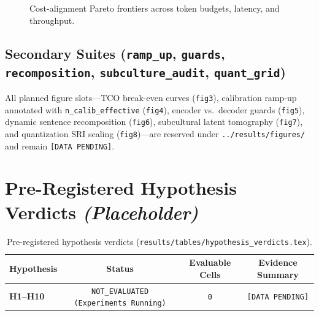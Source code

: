 \documentclass[11pt,letterpaper]{article}
\begin{document}
\begin{figure}[ht]
\centering
\caption{Cost-alignment Pareto frontiers across token budgets, latency, and throughput.}
\label{fig:pareto}
\end{figure}

\subsection{Secondary Suites (\texttt{ramp\_up}, \texttt{guards}, \texttt{recomposition}, \texttt{subculture\_audit}, \texttt{quant\_grid})}
All planned figure slots---TCO break-even curves (\texttt{fig3}), calibration ramp-up annotated with \texttt{n\_calib\_effective} (\texttt{fig4}), encoder vs.\ decoder guards (\texttt{fig5}), dynamic sentence recomposition (\texttt{fig6}), subcultural latent tomography (\texttt{fig7}), and quantization SRI scaling (\texttt{fig8})---are reserved under \texttt{../results/figures/} and remain \texttt{[DATA PENDING]}.

\section{Pre-Registered Hypothesis Verdicts \textit{(Placeholder)}}

% 
\begin{table}[ht]
\centering
\caption{Pre-registered hypothesis verdicts (\texttt{results/tables/hypothesis\_verdicts.tex}).}
\label{tab:verdicts_placeholder}
\begin{tabular}{lccc}
\toprule
\textbf{Hypothesis} & \textbf{Status} & \textbf{Evaluable Cells} & \textbf{Evidence Summary} \\
\midrule
\textbf{H1--H10} & \texttt{NOT\_EVALUATED (Experiments Running)} & \texttt{0} & \texttt{[DATA PENDING]} \\
\bottomrule
\end{tabular}
\end{table}
\end{document}
